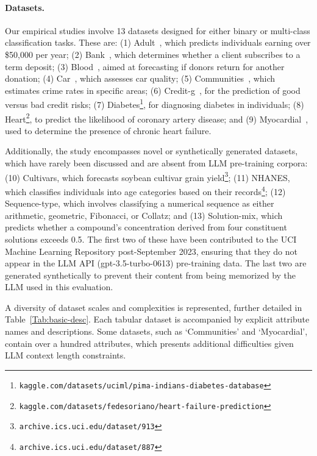 \paragraph{Datasets.}
Our empirical studies involve 13 datasets designed for either binary or multi-class classification tasks. These are: (1) Adult~\cite{asuncion2007uci}, which predicts individuals earning over \$50,000 per year; (2) Bank~\cite{moro2014data}, which determines whether a client subscribes to a term deposit; (3) Blood~\cite{yeh2009knowledge}, aimed at forecasting if donors return for another donation; (4) Car~\cite{kadra2021well}, which assesses car quality; (5) Communities~\cite{misc_communities_and_crime_183}, which estimates crime rates in specific areas; (6) Credit-g~\cite{kadra2021well}, for the prediction of good versus bad credit risks; (7) Diabetes\footnote{\texttt{kaggle.com/datasets/uciml/pima-indians-diabetes-database}}, for diagnosing diabetes in individuals; (8) Heart\footnote{\texttt{kaggle.com/datasets/fedesoriano/heart-failure-prediction}}, to predict the likelihood of coronary artery disease; and (9) Myocardial~\cite{misc_myocardial_infarction_complications_579}, used to determine the presence of chronic heart failure.

Additionally, the study encompasses novel or synthetically generated datasets, which have rarely been discussed and are absent from LLM pre-training corpora: (10) Cultivars, which forecasts soybean cultivar grain yield\footnote{\texttt{archive.ics.uci.edu/dataset/913}}; (11) NHANES, which classifies individuals into age categories based on their records\footnote{\texttt{archive.ics.uci.edu/dataset/887}}; (12) Sequence-type, which involves classifying a numerical sequence as either arithmetic, geometric, Fibonacci, or Collatz; and (13) Solution-mix, which predicts whether a compound’s concentration derived from four constituent solutions exceeds 0.5. The first two of these have been contributed to the UCI Machine Learning Repository post-September 2023, ensuring that they do not appear in the LLM API (gpt-3.5-turbo-0613) pre-training data. The last two are generated synthetically to prevent their content from being memorized by the LLM used in this evaluation.

A diversity of dataset scales and complexities is represented, further detailed in Table~\ref{Tab:basic-desc}.
Each tabular dataset is accompanied by explicit attribute names and descriptions. Some datasets, such as `Communities' and `Myocardial', contain over a hundred attributes, which presents additional difficulties given LLM context length constraints.

